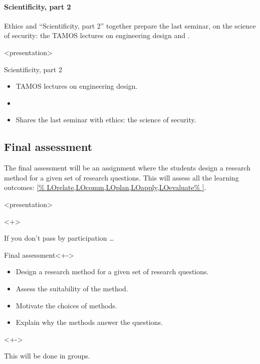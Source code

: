 \paragraph{Scientificity, part 2}

Ethics and \enquote{Scientificity, part 2} together prepare the last seminar,
on the science of security: the TAMOS lectures on engineering design and
.

\begin{frame}<presentation>
  \begin{block}{Scientificity, part 2}
    \begin{itemize}
      \item TAMOS lectures on engineering design.
      \item {}
      \item Shares the last seminar with ethics: the science of security.
    \end{itemize}
  \end{block}
\end{frame}

\subsection{Final assessment}

The final assessment will be an assignment where the students design a research 
method for a given set of research questions.
This will assess all the learning outcomes: \cref{%
  LOrelate,LOcomm,LOplan,LOapply,LOevaluate%
}.

\begin{frame}<presentation>
  \begin{uncoverenv}<+>
  \begin{remark}
    If you don't pass by participation \dots
  \end{remark}
  \end{uncoverenv}

  \begin{block}{Final assessment}<+->
    \begin{itemize}
      \item Design a research method for a given set of research questions.
      \item Assess the suitability of the method.
      \item Motivate the choices of methods.
      \item Explain why the methods answer the questions.
    \end{itemize}
  \end{block}

  \begin{uncoverenv}<+->
  \begin{remark}
    This will be done in groups.
  \end{remark}
  \end{uncoverenv}
\end{frame}

